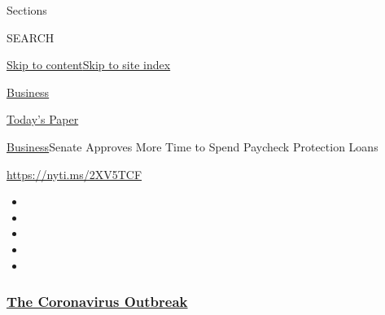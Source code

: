 Sections

SEARCH

\protect\hyperlink{site-content}{Skip to
content}\protect\hyperlink{site-index}{Skip to site index}

\href{https://www.nytimes3xbfgragh.onion/section/business}{Business}

\href{https://myaccount.nytimes3xbfgragh.onion/auth/login?response_type=cookie\&client_id=vi}{}

\href{https://www.nytimes3xbfgragh.onion/section/todayspaper}{Today's
Paper}

\href{/section/business}{Business}\textbar{}Senate Approves More Time to
Spend Paycheck Protection Loans

\url{https://nyti.ms/2XV5TCF}

\begin{itemize}
\item
\item
\item
\item
\item
\end{itemize}

\hypertarget{the-coronavirus-outbreak}{%
\subsubsection{\texorpdfstring{\href{https://www.nytimes3xbfgragh.onion/news-event/coronavirus?name=styln-coronavirus-markets\&region=TOP_BANNER\&variant=undefined\&block=storyline_menu_recirc\&action=click\&pgtype=Article\&impression_id=99c3e650-e39b-11ea-bae2-edbc4ce8b9dc}{The
Coronavirus
Outbreak}}{The Coronavirus Outbreak}}\label{the-coronavirus-outbreak}}

